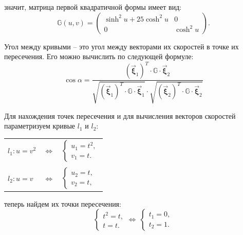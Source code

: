 \documentclass[12pt,a4paper]{article}
\newcommand{\boldVec}[1]{\vec{\mathbf #1}}
\begin{document}
    \noindent значит, матрица первой квадратичной формы имеет вид: 
    \[
       \mathbb{G}(u, v) = 
       \begin{pmatrix}
           \sinh^2 u + 25 \cosh^2 u & 0
           \\
           0                        & \cosh^2 u
       \end{pmatrix}\! .
    \]

    Угол между кривыми -- это угол между векторами их скоростей в точке их пересечения. Его можно вычислить по следующей формуле:
    \[
        \cos \alpha = \frac {
            (\boldVec \xi_1)^T \cdot \mathbb{G} \cdot \boldVec \xi_2
        } {
            \sqrt{(\boldVec \xi_1)^T \cdot \mathbb{G} \cdot \boldVec \xi_1}
             \cdot 
             \sqrt{(\boldVec \xi_2)^T \cdot \mathbb{G} \cdot \boldVec \xi_2}
        }
    \]
    
    Для нахождения точек пересечения и для вычисления векторов скоростей параметризуем кривые $ l_1 $ и $ l_2 \colon$
    \begin{table}[h]
        \centering
        \begin{tabular}{lcl}
            $
                l_1 \colon u = v^2
            $ 
            & $ \Leftrightarrow $ & 
            $
                \begin{cases}
                    u_1 = t^2,
                    \\
                    v_1 = t.
                \end{cases}
            $

            \\ \\

            $
                l_2 \colon u = v
            $ 
            & $ \Leftrightarrow $ & 
            $
                \begin{cases}
                    u_2 = t,
                    \\
                    v_2 = t,
                \end{cases}
            $
        \end{tabular}
    \end{table}
    
    \noindent теперь найдем их точки пересечения:
    \[
        \begin{cases}
            t^2 = t,
            \\
            t = t.
        \end{cases}
        \Leftrightarrow \ 
        \begin{cases}
            t_1 = 0,
            \\
            t_2 = 1.
        \end{cases}
    \]
    
\end{document}
